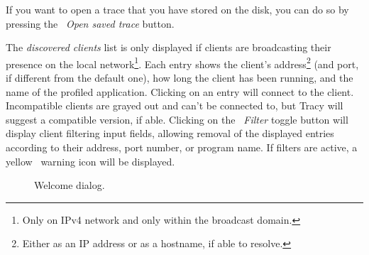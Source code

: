 \documentclass[hidelinks,titlepage,a4paper,twoside]{article}
\begin{document}
If you want to open a trace that you have stored on the disk, you can do so by pressing the \faFolderOpen{}~\emph{Open saved trace} button.

The \emph{discovered clients} list is only displayed if clients are broadcasting their presence on the local network\footnote{Only on IPv4 network and only within the broadcast domain.}. Each entry shows the client's address\footnote{Either as an IP address or as a hostname, if able to resolve.} (and port, if different from the default one), how long the client has been running, and the name of the profiled application. Clicking on an entry will connect to the client. Incompatible clients are grayed out and can't be connected to, but Tracy will suggest a compatible version, if able. Clicking on the \emph{\faFilter{}~Filter} toggle button will display client filtering input fields, allowing removal of the displayed entries according to their address, port number, or program name. If filters are active, a yellow \faExclamationTriangle{}~warning icon will be displayed.

\begin{figure}[h]
\centering{}
\caption{Welcome dialog.}
\label{welcomedialog}
\end{figure}
\end{document}
